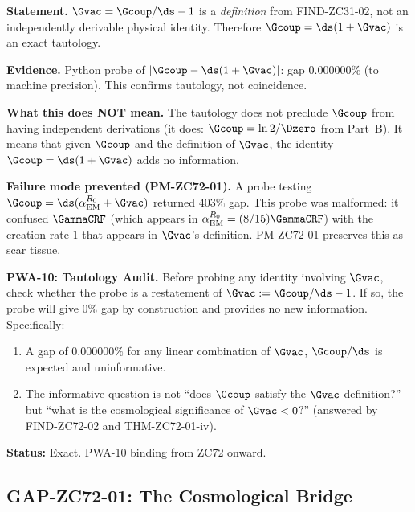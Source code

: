 \documentclass[12pt, a4paper]{article}
\renewcommand{\aEM}{\alpha_{\rm EM}}
\begin{document}

\begin{derivedbox}[title={COR-ZC72-02: $\Gamma_{\rm vac}$ Tautology
  Confirmed; PWA-10 Registered ($R_0$, Exact)}]

\textbf{Statement.}
$\Gvac = \Gcoup/\ds - 1$ is a \emph{definition} from FIND-ZC31-02,
not an independently derivable physical identity.
Therefore $\Gcoup = \ds(1 + \Gvac)$ is an exact tautology.

\textbf{Evidence.}
Python probe of $|\Gcoup - \ds(1+\Gvac)|$: gap $0.000000\%$
(to machine precision). This confirms tautology, not coincidence.

\textbf{What this does NOT mean.}
The tautology does not preclude $\Gcoup$ from having independent
derivations (it does: $\Gcoup = \ln2/\Dzero$ from Part~B).
It means that given $\Gcoup$ and the definition of $\Gvac$,
the identity $\Gcoup = \ds(1+\Gvac)$ adds no information.

\textbf{Failure mode prevented (PM-ZC72-01).}
A probe testing $\Gcoup = \ds(\aEM^{R_0} + \Gvac)$ returned
$403\%$ gap.
This probe was malformed: it confused $\GammaCRF$ (which appears
in $\aEM^{R_0} = (8/15)\GammaCRF$) with the creation rate $1$
that appears in $\Gvac$'s definition.
PM-ZC72-01 preserves this as scar tissue.

\medskip
\textbf{PWA-10: Tautology Audit.}
Before probing any identity involving $\Gvac$, check whether the
probe is a restatement of $\Gvac := \Gcoup/\ds - 1$.
If so, the probe will give $0\%$ gap by construction and provides
no new information.
Specifically:
\begin{enumerate}[leftmargin=2em, noitemsep]
  \item A gap of $0.000000\%$ for any linear combination of
    $\Gvac$, $\Gcoup/\ds$ is expected and uninformative.
  \item The informative question is not ``does $\Gcoup$ satisfy
    the $\Gvac$ definition?'' but ``what is the cosmological
    significance of $\Gvac < 0$?'' (answered by FIND-ZC72-02
    and THM-ZC72-01-iv).
\end{enumerate}

\textbf{Status:} Exact. PWA-10 binding from ZC72 onward.
\end{derivedbox}

\subsection{GAP-ZC72-01: The Cosmological Bridge}
\label{sec:gap01}
\end{document}
